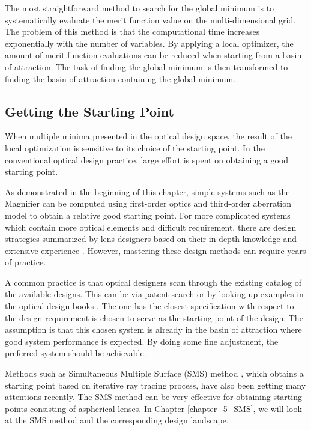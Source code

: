 The most straightforward method to search for the global minimum is to systematically evaluate the merit function value on the multi-dimensional grid. The problem of this method is that the computational time increases exponentially with the number of variables. By applying a local optimizer, the amount of merit function evaluations can be reduced when starting from a basin of attraction. The task of finding the global minimum is then transformed to finding the basin of attraction containing the global minimum. 

\subsection{Getting the Starting Point}
When multiple minima presented in the optical design space, the result of the local optimization is sensitive to its choice of the starting point. In the conventional optical design practice, large effort is spent on obtaining a good starting point. 

As demonstrated in the beginning of this chapter, simple systems such as the Magnifier can be computed using first-order optics and third-order aberration model to obtain a relative good starting point. For more complicated systems which contain more optical elements and difficult requirement, there are design strategies summarized by lens designers based on their in-depth knowledge and extensive experience \cite{LivshitsQA2013}\cite{Shafer1995_moreless}. However, mastering these design methods can require years of practice.   

A common practice is that optical designers scan through the existing catalog of the available designs. This can be via patent search or by looking up examples in the optical design books \cite{smith1992modern} \cite{book:SmithModernOpticalEngineering}.  The one has the closest specification with respect to the design requirement is chosen to serve as the  starting point of the design. The assumption is that this chosen system is already in the basin of attraction where good system performance is expected. By doing some fine adjustment, the preferred system should be achievable. 

Methods such as Simultaneous Multiple Surface (SMS) method \cite{MinanoOE09}, which obtains a starting point based on iterative ray tracing process, have also been getting many attentions recently. The SMS method can be very effective for obtaining starting points consisting of aspherical lenses. In Chapter \ref{chapter_5_SMS}, we will look at the SMS method and the corresponding design landscape. 

